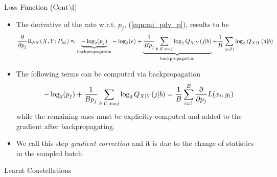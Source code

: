 \documentclass[english,aspectratio=1610,9pt,helvet,nicetitles]{ICEbeamerTUMCD}
\begin{document}
\begin{frame}{Loss Function (Cont'd)}	
\begin{itemize}
 	\item The derivative of the rate w.r.t. $p_j$, (\ref{eqn:mi_pdv_p}), results to be
	\begin{align}
		\pdv{p_j} \mathbb{R}_{PS} \left(X , Y ; P_M \right) \approx \underbrace{- \log_2 (p_j)}_\text{backpropagation} - \log_2 (e) + \underbrace{\dfrac{1}{Bp_j}\sum \limits_{b \text{ if } x=j} \log_2 Q_{X|Y}(j|b)}_\text{backpropagation} + \dfrac{1}{B} \sum \limits_{(a,b)} \log_2 Q_{X|Y}(a|b)
	\end{align}
	
	\item The following terms can be computed via backpropagation
	\begin{align}
		- \log_2 (p_j) + \dfrac{1}{Bp_j}\sum \limits_{b \text{ if } x=j} \log_2 Q_{X|Y}(j|b) = \dfrac{1}{B} \sum \limits_{i = 1}^{B} \pdv{p_j} L(x_i, y_i)
	\end{align}
	while the remaining ones must be explicitly computed and added to the gradient after backpropagating.
	\item We call this step \textit{gradient correction} and it is due to the change of statistics in the sampled batch.
\end{itemize}
\end{frame}
	

\begin{frame}{Learnt Constellations}
\begin{columns}[T,onlytextwidth]
		\begin{column}{.5\textwidth}
        \begin{figure}[h]
		    
		    \label{subfig:arefk5dB}
		    \\
	        
	        \label{subfig:aref18dB}
		    \label{fig:arefQAM}
		\end{figure}
        \end{column}
        \begin{column}{.5\textwidth}
        \begin{figure}[h]
		    
		    \label{subfig:aref5dB}
		    \\
	        
	        \label{subfig:aref18dB}
		    \label{fig:arefMASK}
		\end{figure}
        \end{column}
\end{columns}
\end{frame}
\end{document}
